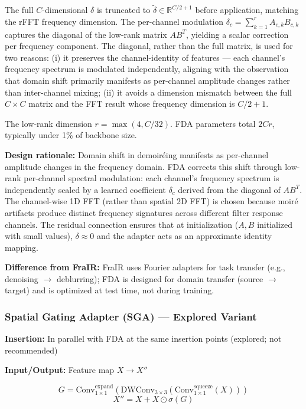 \documentclass[10pt,twocolumn,letterpaper]{article}
\begin{document}
The full $C$-dimensional $\delta$ is truncated to $\tilde{\delta} \in \mathbb{R}^{C/2+1}$ before application, matching the rFFT frequency dimension. The per-channel modulation $\delta_c = \sum_{k=1}^{r} A_{c,k} B_{c,k}$ captures the diagonal of the low-rank matrix $A B^T$, yielding a scalar correction per frequency component. The diagonal, rather than the full matrix, is used for two reasons: (i) it preserves the channel-identity of features --- each channel's frequency spectrum is modulated independently, aligning with the observation that domain shift primarily manifests as per-channel amplitude changes rather than inter-channel mixing; (ii) it avoids a dimension mismatch between the full $C \times C$ matrix and the FFT result whose frequency dimension is $C/2+1$.

The low-rank dimension $r = \max(4, C/32)$. FDA parameters total $2Cr$, typically under 1\% of backbone size.

\textbf{Design rationale:} Domain shift in demoir\'{e}ing manifests as per-channel amplitude changes in the frequency domain. FDA corrects this shift through low-rank per-channel spectral modulation: each channel's frequency spectrum is independently scaled by a learned coefficient $\delta_c$ derived from the diagonal of $A B^T$. The channel-wise 1D FFT (rather than spatial 2D FFT) is chosen because moir\'{e} artifacts produce distinct frequency signatures across different filter response channels. The residual connection ensures that at initialization ($A, B$ initialized with small values), $\delta \approx 0$ and the adapter acts as an approximate identity mapping.

\textbf{Difference from FraIR:} FraIR \cite{anonymous2026frair} uses Fourier adapters for task transfer (e.g., denoising $\to$ deblurring); FDA is designed for domain transfer (source $\to$ target) and is optimized at test time, not during training.

\subsubsection{Spatial Gating Adapter (SGA) --- Explored Variant}

\textbf{Insertion:} In parallel with FDA at the same insertion points (explored; not recommended)

\textbf{Input/Output:} Feature map $X \to X''$

\begin{equation}
G = \text{Conv}_{1\times 1}^{\text{expand}}(\text{DWConv}_{3\times 3}(\text{Conv}_{1\times 1}^{\text{squeeze}}(X)))
\end{equation}
\begin{equation}
X'' = X + X \odot \sigma(G)
\end{equation}
\end{document}
